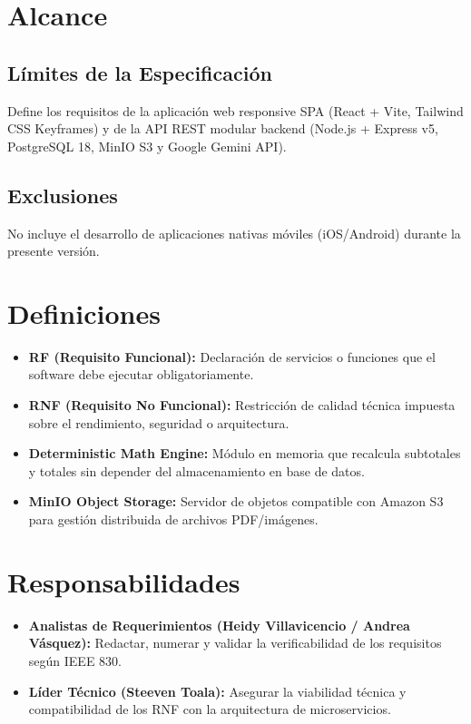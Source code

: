\documentclass[12pt,a4paper]{article}
\begin{document}
\section{Alcance}

\subsection{Límites de la Especificación}
Define los requisitos de la aplicación web responsive SPA (React + Vite, Tailwind CSS Keyframes) y de la API REST modular backend (Node.js + Express v5, PostgreSQL 18, MinIO S3 y Google Gemini API).

\subsection{Exclusiones}
No incluye el desarrollo de aplicaciones nativas móviles (iOS/Android) durante la presente versión.

\section{Definiciones}
\begin{itemize}[leftmargin=1.5em, itemsep=2pt, topsep=2pt]
    \item \textbf{RF (Requisito Funcional):} Declaración de servicios o funciones que el software debe ejecutar obligatoriamente.
    \item \textbf{RNF (Requisito No Funcional):} Restricción de calidad técnica impuesta sobre el rendimiento, seguridad o arquitectura.
    \item \textbf{Deterministic Math Engine:} Módulo en memoria que recalcula subtotales y totales sin depender del almacenamiento en base de datos.
    \item \textbf{MinIO Object Storage:} Servidor de objetos compatible con Amazon S3 para gestión distribuida de archivos PDF/imágenes.
\end{itemize}

\section{Responsabilidades}
\begin{itemize}[leftmargin=1.5em, itemsep=2pt, topsep=2pt]
    \item \textbf{Analistas de Requerimientos (Heidy Villavicencio / Andrea Vásquez):} Redactar, numerar y validar la verificabilidad de los requisitos según IEEE 830.
    \item \textbf{Líder Técnico (Steeven Toala):} Asegurar la viabilidad técnica y compatibilidad de los RNF con la arquitectura de microservicios.
\end{itemize}
\end{document}
